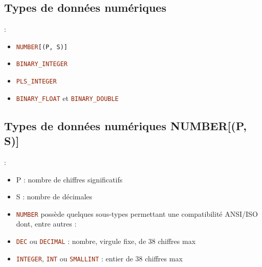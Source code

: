 \documentclass[10pt]{beamer}
\begin{document}
\subsection{Types de données numériques}
\begin{frame}{\secname : \subsecname}
    \begin{itemize}
        \item \lstinline[language=sql]!NUMBER[(P, S)]!
        \item \lstinline[language=sql]!BINARY_INTEGER!
        \item \lstinline[language=sql]!PLS_INTEGER!
        \item \lstinline[language=sql]!BINARY_FLOAT! et \lstinline[language=sql]!BINARY_DOUBLE!
    \end{itemize}

\end{frame}

\subsection{Types de données numériques NUMBER[(P, S)]}
\begin{frame}{\secname : \subsecname}
    \begin{itemize}
        \item P : nombre de chiffres significatifs
        \item S : nombre de décimales
        \item \lstinline[language=sql]!NUMBER! possède quelques sous-types permettant une compatibilité ANSI/ISO dont, entre autres :
        \item \lstinline[language=sql]!DEC! ou \lstinline[language=sql]!DECIMAL! : nombre, virgule fixe, de 38 chiffres max
        \item \lstinline[language=sql]!INTEGER!, \lstinline[language=sql]!INT! ou \lstinline[language=sql]!SMALLINT! : entier de 38 chiffres max
    \end{itemize}
\end{frame}
\end{document}
